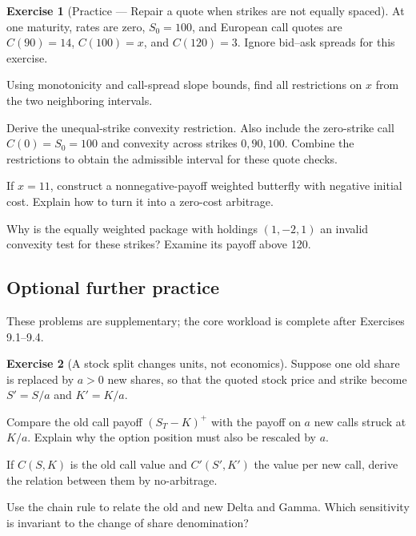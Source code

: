 \documentclass[11pt]{article}
\theoremstyle{definition}
\newtheorem{exercise}{Exercise}[section]
\begin{document}
\begin{exercise}[Practice --- Repair a quote when strikes are not equally spaced]
At one maturity, rates are zero, \(S_0=100\), and European call
quotes are \(C(90)=14\), \(C(100)=x\), and \(C(120)=3\). Ignore
bid--ask spreads for this exercise.
\begin{exparts}
\item Using monotonicity and call-spread slope bounds, find all restrictions on \(x\) from the two neighboring intervals.
\item Derive the unequal-strike convexity restriction. Also include the zero-strike call \(C(0)=S_0=100\) and convexity across strikes \(0,90,100\). Combine the restrictions to obtain the admissible interval for these quote checks.
\item If \(x=11\), construct a nonnegative-payoff weighted butterfly with negative initial cost. Explain how to turn it into a zero-cost arbitrage.
\item Why is the equally weighted package with holdings \((1,-2,1)\) an invalid convexity test for these strikes? Examine its payoff above 120.
\end{exparts}
\end{exercise}
\fi

\ifIncludeFurther
{}
\subsection*{Optional further practice}
\noindent These problems are supplementary; the core workload is complete after Exercises 9.1--9.4.
\setcounter{exercise}{4}
\begin{exercise}[A stock split changes units, not economics]
Suppose one old share is replaced by \(a>0\) new shares, so that the quoted
stock price and strike become \(S'=S/a\) and \(K'=K/a\).
\begin{exparts}
  \item Compare the old call payoff \((S_T-K)^+\) with the payoff on \(a\)
  new calls struck at \(K/a\). Explain why the option position must also be
  rescaled by \(a\).
  \item If \(C(S,K)\) is the old call value and \(C'(S',K')\) the value per
  new call, derive the relation between them by no-arbitrage.
  \item Use the chain rule to relate the old and new Delta and Gamma. Which
  sensitivity is invariant to the change of share denomination?
\end{exparts}
\end{exercise}
\fi

\ifdefined\ExercisesSynthesis\else
\end{document}
